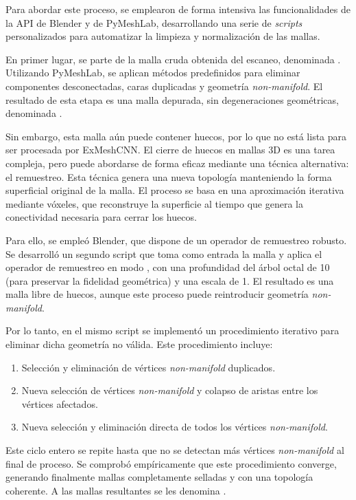 Para abordar este proceso, se emplearon de forma intensiva las funcionalidades de la API de Blender y de PyMeshLab, desarrollando una serie de \textit{scripts} personalizados para automatizar la limpieza y normalización de las mallas.

En primer lugar, se parte de la malla cruda obtenida del escaneo, denominada . Utilizando PyMeshLab, se aplican métodos predefinidos para eliminar componentes desconectadas, caras duplicadas y geometría \textit{non-manifold}. El resultado de esta etapa es una malla depurada, sin degeneraciones geométricas, denominada .

Sin embargo, esta malla aún puede contener huecos, por lo que no está lista para ser procesada por ExMeshCNN. El cierre de huecos en mallas 3D es una tarea compleja, pero puede abordarse de forma eficaz mediante una técnica alternativa: el remuestreo. Esta técnica genera una nueva topología manteniendo la forma superficial original de la malla. El proceso se basa en una aproximación iterativa mediante vóxeles, que reconstruye la superficie al tiempo que genera la conectividad necesaria para cerrar los huecos.

Para ello, se empleó Blender, que dispone de un operador de remuestreo robusto. Se desarrolló un segundo script que toma como entrada la malla  y aplica el operador de remuestreo en modo , con una profundidad del árbol octal de 10 (para preservar la fidelidad geométrica) y una escala de 1. El resultado es una malla libre de huecos, aunque este proceso puede reintroducir geometría \textit{non-manifold}.

Por lo tanto, en el mismo script se implementó un procedimiento iterativo para eliminar dicha geometría no válida. Este procedimiento incluye:

\begin{enumerate}
    \item Selección y eliminación de vértices \textit{non-manifold} duplicados.
    \item Nueva selección de vértices \textit{non-manifold} y colapso de aristas entre los vértices afectados.
    \item Nueva selección y eliminación directa de todos los vértices \textit{non-manifold}.
\end{enumerate}
Este ciclo entero se repite hasta que no se detectan más vértices \textit{non-manifold} al final de proceso. Se comprobó empíricamente que este procedimiento converge, generando finalmente mallas completamente selladas y con una topología coherente. A las mallas resultantes se les denomina .

